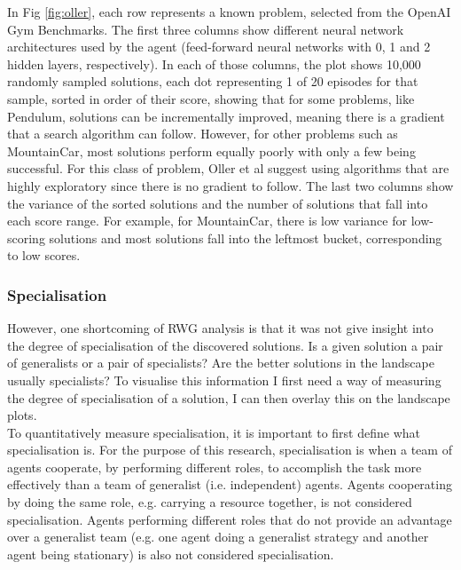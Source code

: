 \documentclass[12pt]{article}
\begin{document}
In Fig \ref{fig:oller}, each row represents a known problem, selected from the OpenAI Gym Benchmarks.
The first three columns show different neural network architectures used by the agent (feed-forward neural networks with 0, 1 and 2 hidden layers, respectively).
In each of those columns, the plot shows 10,000 randomly sampled solutions, each dot representing 1 of 20 episodes for that sample, sorted in order of their score, showing that for some problems, like Pendulum, solutions can be incrementally improved, meaning there is a gradient that a search algorithm can follow.
However, for other problems such as MountainCar, most solutions perform equally poorly with only a few being successful.
For this class of problem, Oller et al suggest using algorithms that are highly exploratory since there is no gradient to follow.
The last two columns show the variance of the sorted solutions and the number of solutions that fall into each score range.
For example, for MountainCar, there is low variance for low-scoring solutions and most solutions fall into the leftmost bucket, corresponding to low scores.\\

\subsubsection{Specialisation}

However, one shortcoming of RWG analysis is that it was not give insight into the degree of specialisation of the discovered solutions.
Is a given solution a pair of generalists or a pair of specialists? 
Are the better solutions in the landscape usually specialists? 
To visualise this information I first need a way of measuring the degree of specialisation of a solution, I can then overlay this on the landscape plots.\\

To quantitatively measure specialisation, it is important to first define what specialisation is.
For the purpose of this research, specialisation is when a team of agents cooperate, by performing different roles, to accomplish the task more effectively than a team of generalist (i.e. independent) agents.
Agents cooperating by doing the same role, e.g. carrying a resource together, is not considered specialisation.
Agents performing different roles that do not provide an advantage over a generalist team (e.g. one agent doing a generalist strategy and another agent being stationary) is also not considered specialisation.\\
\end{document}
